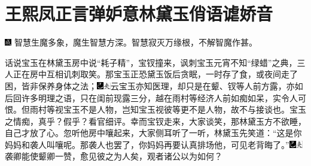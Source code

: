 

\chapter{王熙凤正言弹妒意\hspace{.5em}林黛玉俏语谑娇音}

{\includegraphics[width=3mm]{../Images/00005}  \kaishu 智慧生魔多象，魔生智慧方深。智慧寂灭万缘根，不解智魔作甚。}


话说宝玉在林黛玉房中说``耗子精''，宝钗撞来，讽刺宝玉元宵不知``绿蜡''之典，三人正在房中互相讥刺取笑。那宝玉正恐黛玉饭后贪眠，一时存了食，或夜间走了困，皆非保养身体之法；{\includegraphics[width=3mm]{../Images/00003}\includegraphics[width=3mm]{../Images/00012}\footnotesize \kaishu 云宝玉亦知医理，却只是在颦、钗等人前方露，亦如后回许多明理之语，只在闺前现露三分，越在雨村等经济人前如痴如呆，实令人可恨。但雨村等视宝玉不是人物，岂知宝玉视彼等更不是人物，故不与接谈也。宝玉之情痴，真乎？假乎？看官细评。}幸而宝钗走来，大家谈笑，那林黛玉方不欲睡，自己才放了心。忽听他房中嚷起来，大家侧耳听了一听，林黛玉先笑道：``这是你妈妈和袭人叫嚷呢。那袭人也罢了，你妈妈再要认真排场他，可见老背晦了。''{\includegraphics[width=3mm]{../Images/00003}\includegraphics[width=3mm]{../Images/00012}\footnotesize \kaishu 袭卿能使颦卿一赞，愈见彼之为人矣，观者诸公以为如何？}

